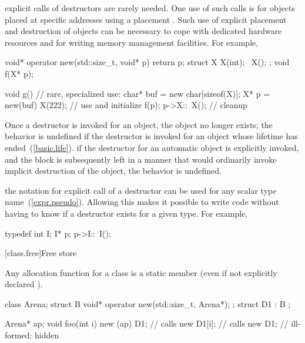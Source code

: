 \pnum
\enternote
{}%
explicit calls of destructors are rarely needed.
One use of such calls is for objects placed at specific
addresses using a placement
.
Such use of explicit placement and destruction of objects can be necessary
to cope with dedicated hardware resources and for writing memory management
facilities.
For example,
%

\begin{codeblock}
void* operator new(std::size_t, void* p) { return p; }
struct X {
  X(int);
  ~X();
};
void f(X* p);

void g() {                      // rare, specialized use:
  char* buf = new char[sizeof(X)];
  X* p = new(buf) X(222);       // use  and initialize
  f(p);
  p->X::~X();                   // cleanup
}
\end{codeblock}
\exitnote

\pnum
Once a destructor is invoked for an object, the object no longer exists;
the behavior is undefined if the destructor is invoked
for an object whose lifetime has ended~(\ref{basic.life}).
\enterexample
if the destructor for an automatic object is explicitly invoked,
and the block is subsequently left in a manner that would ordinarily
invoke implicit destruction of the object, the behavior is undefined.
\exitexample

\pnum
\enternote
{}%
the notation for explicit call of a destructor can be used for any scalar type
name~(\ref{expr.pseudo}).
Allowing this makes it possible to write code without having to know if a
destructor exists for a given type.
For example,

\begin{codeblock}
typedef int I;
I* p;
p->I::~I();
\end{codeblock}
\exitnote

[class.free]{Free store}%
%

\pnum
{}
Any allocation function for a class
is a static member (even if not explicitly declared
).

\pnum
\enterexample

\begin{codeblock}
class Arena;
struct B {
  void* operator new(std::size_t, Arena*);
};
struct D1 : B {
};

Arena*  ap;
void foo(int i) {
  new (ap) D1;      // calls 
  new D1[i];        // calls 
  new D1;           // ill-formed:  hidden
}
\end{codeblock}
\exitexample

